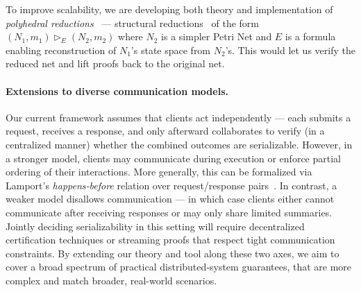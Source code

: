 To improve scalability, we are developing both theory and implementation of \textit{polyhedral reductions}~\cite{AmBeDa21} --- structural reductions~\cite{Be87,BeLeDa20} of the form $(N_1, m_1) \vartriangleright_E (N_2, m_2)$ where $N_2$ is a simpler Petri Net and $E$ is a formula enabling reconstruction of $N_1$'s state space from $N_2$'s. This would let us verify the reduced net and lift proofs back to the original net.
%
%
%
%


\paragraph{Extensions to diverse communication models.}

Our current framework assumes that clients act independently --- each submits a request, receives a response, and only afterward collaborates to verify (in a centralized manner) whether the combined outcomes are serializable. However, in a stronger model, clients may communicate during execution or enforce partial ordering of their interactions. More generally, this can be formalized via Lamport’s \textit{happens‐before} relation over request/response pairs~\cite{La78}. 
%
In contrast, a weaker model disallows communication --- in which case clients either cannot communicate after receiving responses or may only share limited summaries. Jointly deciding serializability in this setting will require decentralized certification techniques or streaming proofs that respect tight communication constraints. 
%
By extending our theory and tool along these two axes, we aim to cover a broad spectrum of practical distributed‐system guarantees, that are more complex and match broader, real-world scenarios.

%
%
%
